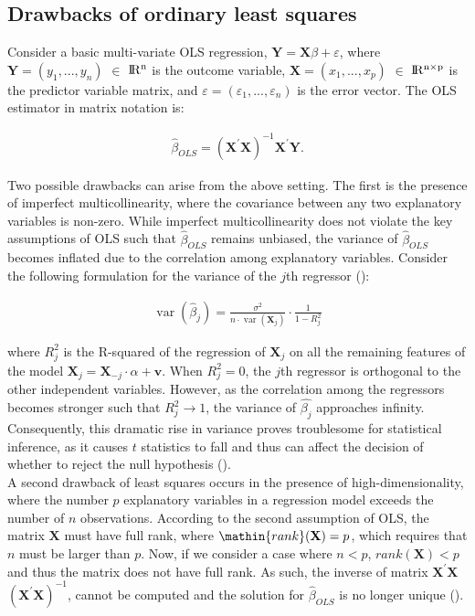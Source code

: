 \subsection{Drawbacks of ordinary least squares}
\noindent Consider a basic multi-variate OLS regression, $\mathbf{Y} = \mathbf{X} \beta + \varepsilon$, where $\mathbf{Y}=(y_1,...,y_n)$ $\in$ ${\rm I\!R^{n}}$ is the outcome variable, $\mathbf{X}=(x_1,...,x_p)$ $\in$ ${\rm I\!R^{n \times p}}$ is the predictor variable matrix, and $\varepsilon=(\varepsilon_1,...,\varepsilon_n)$ is the error vector. The OLS estimator in matrix notation is:

\begin{align}
\hat{\beta}_{OLS}=(\mathbf{X}^{\prime}\mathbf{X})^{-1}\mathbf{X}^{\prime}\mathbf{Y}.
\end{align}

\noindent Two possible drawbacks can arise from the above setting. The first is the presence of imperfect multicollinearity, where the covariance between any two explanatory variables is non-zero. While imperfect multicollinearity does not violate the key assumptions of OLS such that $\hat{\beta}_{OLS}$ remains unbiased, the variance of $\hat{\beta}_{OLS}$ becomes inflated due to the correlation among explanatory variables. Consider the following formulation for the variance of the $j$th regressor (\cite{salmeron2020overcoming}):

\begin{align}
\operatorname{var}\left(\hat{\beta}_{j}\right)=\frac{\sigma^{2}}{n \cdot \operatorname{var}\left(\mathbf{X}_{j}\right)} \cdot \frac{1}{1-R_{j}^{2}}
\end{align}

\noindent where $R_j^2$ is the R-squared of the regression of $\mathbf{X}_{j}$ on all the remaining features of the model $\mathbf{X}_{j}=\mathbf{X}_{-j} \cdot \alpha+\mathbf{v}$. When $R_j^2=0$, the $j$th regressor is orthogonal to the other independent variables. However, as the correlation among the regressors becomes stronger such that $R_j^2 \to 1$, the variance of $\hat{\beta_j}$ approaches infinity. Consequently, this dramatic rise in variance proves troublesome for statistical inference, as it causes $t$ statistics to fall and thus can affect the decision of whether to reject the null hypothesis (\cite{o2007caution}). \\

\noindent A second drawback of least squares occurs in the presence of high-dimensionality, where the number $p$ explanatory variables in a regression model exceeds the number of $n$ observations. According to the second assumption of OLS, the matrix $\mathbf{X}$ must have full rank, where $\mathin{rank}(\mathbf{X}) = p$, which requires that $n$ must be larger than $p$. Now, if we consider a case where  $n < p$, $\mathit{rank}(\mathbf{X}) < p$ and thus the matrix does not have full rank. %
As such, the inverse of matrix $\mathbf{X}^{\prime}\mathbf{X}$  $(\mathbf{X}^{\prime}\mathbf{X})^{-1}$, cannot be computed and the solution for $\hat{\beta}_{OLS}$ is no longer unique (\cite{tibshirani2017sparsity}). 

